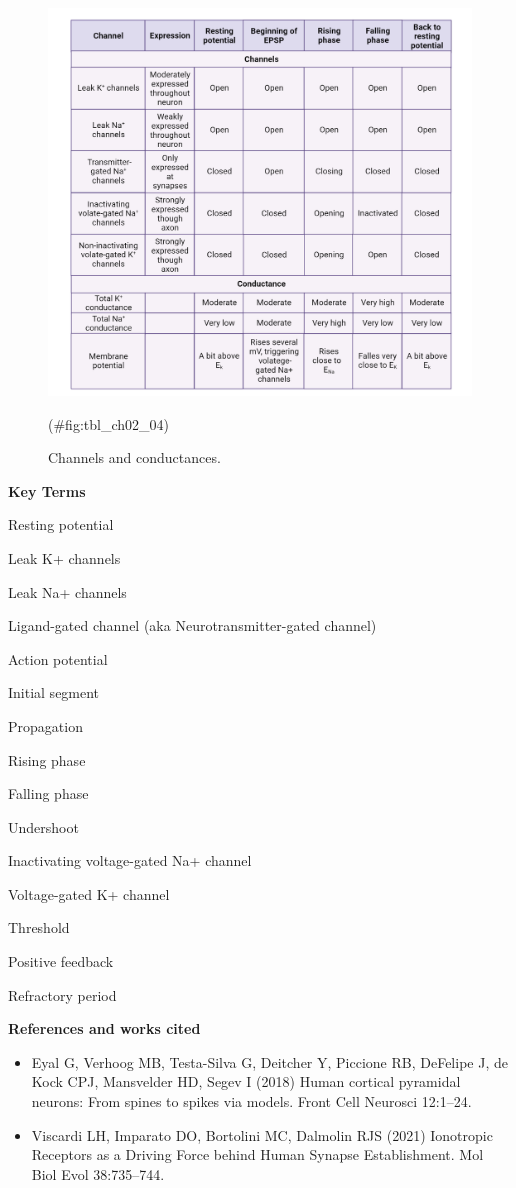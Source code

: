 \documentclass[
]{book}
\begin{document}
\begin{figure}

{\centering \includegraphics[width=0.8\linewidth]{images/ch02/table_02_04} 

}

\caption{Channels and conductances.}(\#fig:tbl_ch02_04)
\end{figure}

\textbf{Key Terms}

Resting potential

Leak K+ channels

Leak Na+ channels

Ligand-gated channel (aka Neurotransmitter-gated channel)

Action potential

Initial segment

Propagation

Rising phase

Falling phase

Undershoot

Inactivating voltage-gated Na+ channel

Voltage-gated K+ channel

Threshold

Positive feedback

Refractory period

\textbf{References and works cited}

\begin{itemize}
\item
  Eyal G, Verhoog MB, Testa-Silva G, Deitcher Y, Piccione RB, DeFelipe J, de Kock CPJ, Mansvelder HD, Segev I (2018) Human cortical pyramidal neurons: From spines to spikes via models. Front Cell Neurosci 12:1--24.
\item
  Viscardi LH, Imparato DO, Bortolini MC, Dalmolin RJS (2021) Ionotropic Receptors as a Driving Force behind Human Synapse Establishment. Mol Biol Evol 38:735--744.
\end{itemize}
\end{document}
